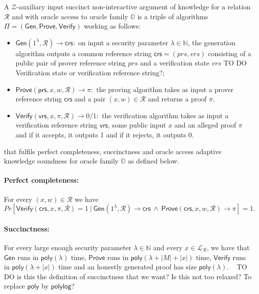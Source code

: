\begin{definition}
\label{def:osnarks}
A $\mathcal{Z}$-auxiliary input succinct non-interactive argument of knowledge for a relation $\mathcal{R}$ and with oracle access to oracle family $\mathbb{O}$
is a triple of algorithms $\Pi=(\mathsf{Gen}, \mathsf{Prove}, \mathsf{Verify})$ working as follows:
\begin{itemize}
\item $\mathsf{Gen}(1^{\lambda},\mathcal{R}) \rightarrow \mathsf{crs}:$ 
on input a security parameter $\lambda \in \mathbb{N}$, the generation algorithm outputs
a common reference string $\mathsf{crs} = (\mathit{prs},\mathit{vrs})$ 
consisting of a public pair of prover reference string $\mathit{prs}$ and a verification state $\mathit{vrs}$ {\color{red} TO DO Verification state or verification reference string?};
\item $\mathsf{Prove}(\mathsf{prs}, x, w, \mathcal{R}) \rightarrow \pi:$ the proving algorithm takes as input 
a prover reference string $\mathsf{crs}$ and a pair $(x,w) \in \mathcal{R}$ and returns a proof $\pi$. 
\item $\mathsf{Verify}(\mathsf{vrs}, x, \pi, \mathcal{R}) \rightarrow 0/1:$ the verification algorithm takes as input 
a verification reference string $\mathsf{vrs}$, some public input $x$ and an alleged proof $\pi$ and if it accepts, 
it outputs 1 and if it rejects, it outputs 0. 
\end{itemize}
\noindent that fulfils perfect completeness, succinctness and oracle access adaptive knowledge soundness for oracle family 
$\mathbb{O}$ as defined below.

\paragraph{Perfect completeness:} For every $(x,w) \in \mathcal{R}$ we have
$$\mathit{Pr}[ \mathsf{Verify}(\mathsf{crs}, x, \pi, \mathcal{R})=1 \  | \  \mathsf{Gen}(1^{\lambda},\mathcal{R}) \rightarrow \mathsf{crs} \ \wedge \  \mathsf{Prove}(\mathsf{crs}, x, w, \mathcal{R}) \rightarrow \pi ] = 1. $$

\paragraph{Succinctness:} For every large enough security parameter $\lambda \in \mathbb{N}$ 
and every $x \in \mathcal{L}_{\mathcal{R}}$, we have that 
$\mathsf{Gen}$ runs in $\mathsf{poly}(\lambda)$ time, $\mathsf{Prove}$ runs in $\mathsf{poly}(\lambda + |M|+ |x|)$ time,  
$\mathsf{Verify}$ runs in $\mathsf{poly}(\lambda + |x|)$ time and an honestly generated proof has size $\mathsf{poly}(\lambda)$. \
{\color{red} TO DO is this the definition of succinctness that we want? Is this not too relaxed? To replace $\mathsf{poly}$ by $\mathsf{polylog}$?}


\end{definition}
